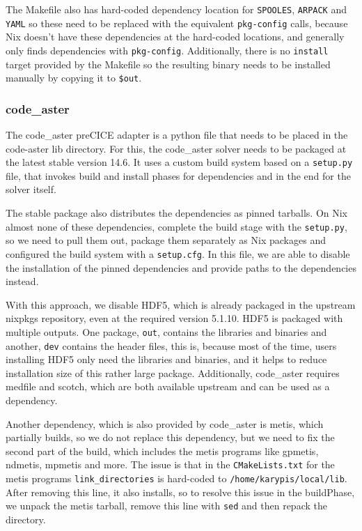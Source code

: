 \documentclass[conference,final,a4paper]{IEEEtran}
\begin{document}
The Makefile also has hard-coded dependency location for \texttt{SPOOLES}, \texttt{ARPACK} and \texttt{YAML} so these need to be replaced with the equivalent \texttt{pkg-config} calls, because Nix doesn't have these dependencies at the hard-coded locations, and generally only finds dependencies with \texttt{pkg-config}.
Additionally, there is no \texttt{install} target provided by the Makefile so the resulting binary needs to be installed manually by copying it to \texttt{\$out}.\\

\subsubsection{code\_aster}

The code\_aster preCICE adapter is a python file that needs to be placed in the code-aster lib directory.
For this, the code\_aster solver needs to be packaged at the latest stable version 14.6.
It uses a custom build system based on a \texttt{setup.py} file, that invokes build and install phases for dependencies and in the end for the solver itself.

The stable package also distributes the dependencies as pinned tarballs.
On Nix almost none of these dependencies, complete the build stage with the \texttt{setup.py}, so we need to pull them out, package them separately as Nix packages and configured the build system with a \texttt{setup.cfg}.
In this file, we are able to disable the installation of the pinned dependencies and provide paths to the dependencies instead.

With this approach, we disable HDF5, which is already packaged in the upstream nixpkgs repository, even at the required version 5.1.10.
HDF5 is packaged with multiple outputs.
One package, \texttt{out}, contains the libraries and binaries and another, \texttt{dev} contains the header files, this is, because most of the time, users installing HDF5 only need the libraries and binaries, and it helps to reduce installation size of this rather large package.
Additionally, code\_aster requires medfile and scotch, which are both available upstream and can be used as a dependency.

Another dependency, which is also provided by code\_aster is metis, which partially builds, so we do not replace this dependency, but we need to fix the second part of the build, which includes the metis programs like gpmetis, ndmetis, mpmetis and more.
The issue is that in the \texttt{CMakeLists.txt} for the metis programs \texttt{link\_directories} is hard-coded to \texttt{/home/karypis/local/lib}.
After removing this line, it also installs, so to resolve this issue in the buildPhase, we unpack the metis tarball, remove this line with \texttt{sed} and then repack the directory.
\end{document}
